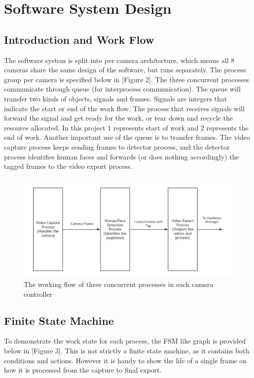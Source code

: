 \documentclass{article}
\begin{document}
\section{Software System Design}

\subsection{Introduction and Work Flow}
\indent The software system is split into per camera architecture, which means all 8 cameras share the same design of the software, but runs separately. The process group per camera is specified below in [Figure 2].\newline
\indent The three concurrent processes communicate through queue (for interprocess communication). The queue will transfer two kinds of objects, signals and frames. Signals are integers that indicate the start or end of the work flow. The process that receives signals will forward the signal and get ready for the work, or tear down and recycle the resource allocated. In this project 1 represents start of work and 2 represents the end of work.\newline
\indent Another important use of the queue is to transfer frames. The video capture process keeps sending frames to detector process, and the detector process identifies human faces and forwards (or does nothing accordingly) the tagged frames to the video export process.

\begin{figure}[h!]
\includegraphics[width=12cm]{EECS488_Sofware_Diagram.png}
\caption{The working flow of three concurrent processes in each camera controller}
\end{figure}

\subsection{Finite State Machine}
\indent To demonstrate the work state for each process, the FSM like graph is provided below in [Figure 3]. This is not strictly a finite state machine, as it contains both conditions and actions. However it is handy to show the life of a single frame on how it is processed from the capture to final export.
\end{document}
